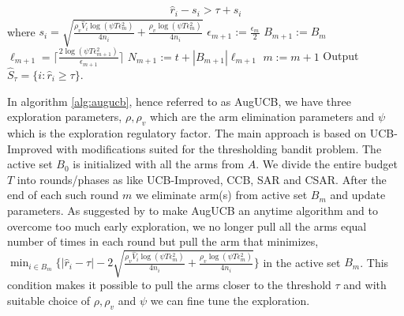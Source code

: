 \begin{algorithm}[th!]
\begin{algorithmic}
\begin{align*}
\hat{r}_{i} - s_i  > \tau + s_i
\end{align*}
where $s_i=\sqrt{\frac{\rho_v\hat{V}_{i}\log{(\psi T\epsilon_{m}^{2})}}{4 n_{i}} + \frac{\rho_v \log{(\psi T\epsilon_{m}^{2})}}{4 n_{i}}}$
\EndArmElimV
\State {}
\ResetParam
\State $\epsilon_{m+1}:=\frac{\epsilon_{m}}{2}$
\State $B_{m+1} := B_{m}$
\State $\ell_{m+1}=\bigg\lceil \frac{2\log(\psi T\epsilon_{m+1}^{2})}{\epsilon_{m+1}} \bigg\rceil$
\State $N_{m+1} := t + |B_{m+1}|\ell_{m+1}$
\State $m := m+1$
\EndResetParam
\EndIf
\EndFor
\State Output $\hat{S}_{\tau}=\lbrace i: \hat{r}_{i}\geq \tau \rbrace$.
\end{algorithmic}
\end{algorithm}



In algorithm \ref{alg:augucb}, hence referred to as AugUCB, we have three exploration parameters, $\rho, \rho_v$ which are the arm elimination parameters and $\psi$ which is the exploration regulatory factor. The main approach is based on UCB-Improved with modifications suited for the thresholding bandit problem. The active set $B_{0}$ is initialized with all the arms from $A$. We divide the entire budget $T$ into rounds/phases as like UCB-Improved, CCB, SAR and CSAR. After the end of each such round $m$ we eliminate arm(s) from active set $B_{m}$ and update parameters. As suggested by \cite{liu2016modification} to make AugUCB an anytime algorithm and to overcome too much early exploration, we no longer pull all the arms equal number of times in each round but pull the arm that minimizes,  
$\min_{i\in B_{m}}\bigg\lbrace |\hat{r}_{i} - \tau | - 2\sqrt{\frac{\rho_v \hat{V}_{i} \log (\psi T \epsilon_{m}^{2})}{4 n_{i}} + \frac{\rho_v \log{(\psi T\epsilon_{m}^{2})}}{4 n_{i}}} \bigg\rbrace $
in the active set $B_{m}$. This condition makes it possible to pull the arms closer to the threshold $\tau$ and with suitable choice of $\rho,\rho_v$ and $\psi$ we can fine tune the exploration. 
